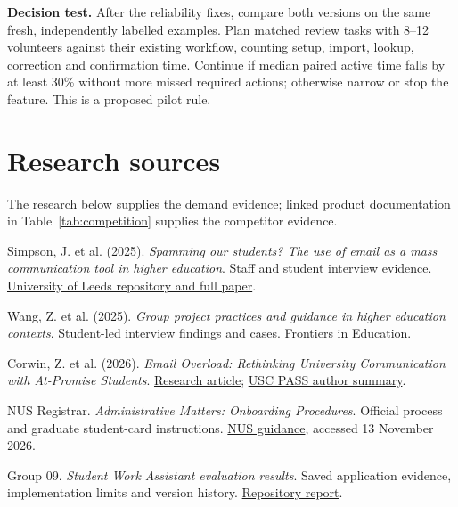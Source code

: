 \documentclass[11pt,a4paper]{article}
\begin{document}
\textbf{Decision test.} After the reliability fixes, compare both versions on the
same fresh, independently labelled examples. Plan matched review tasks with
8--12 volunteers against their existing workflow, counting setup, import,
lookup, correction and confirmation time. Continue if median paired active time
falls by at least 30\% without more missed required actions; otherwise narrow
or stop the feature. This is a proposed pilot rule.

\section*{Research sources}
{\small
The research below supplies the demand evidence; linked product documentation in
Table~\ref{tab:competition} supplies the competitor evidence.
\begin{enumerate}[label={[\arabic*]},leftmargin=2.1em,itemsep=2pt]
\item Simpson, J. et al. (2025). \emph{Spamming our students? The use of email as a mass communication tool in higher education}. Staff and student interview evidence. \href{https://eprints.whiterose.ac.uk/id/eprint/221158/}{University of Leeds repository and full paper}.
\item Wang, Z. et al. (2025). \emph{Group project practices and guidance in higher education contexts}. Student-led interview findings and cases. \href{https://www.frontiersin.org/journals/education/articles/10.3389/feduc.2025.1614627/full}{Frontiers in Education}.
\item Corwin, Z. et al. (2026). \emph{Email Overload: Rethinking University Communication with At-Promise Students}. \href{https://doi.org/10.1080/19496591.2026.2639502}{Research article}; \href{https://pass.pullias.usc.edu/news/email-overload-rethinking-university-communication-with-at-promise-students/}{USC PASS author summary}.
\item NUS Registrar. \emph{Administrative Matters: Onboarding Procedures}. Official process and graduate student-card instructions. \href{https://www.nus.edu.sg/registrar/academic-activities/onboarding/administrative-matters}{NUS guidance}, accessed 13 November 2026.
\item Group 09. \emph{Student Work Assistant evaluation results}. Saved application evidence, implementation limits and version history. \href{https://github.com/YichenLi-02/student-work-assistant/blob/1de2f23/docs/evaluation/RESULTS.md}{Repository report}.
\end{enumerate}}
\end{document}
